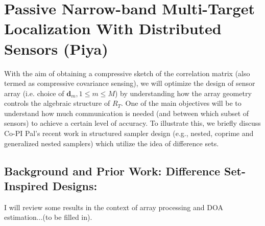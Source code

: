 \section{Passive Narrow-band Multi-Target Localization With Distributed Sensors (Piya)}

With the aim of obtaining a compressive sketch of the correlation matrix (also termed as compressive covariance sensing), we will optimize the design of sensor array (i.e. choice of $\mathbf{d}_m, 1\leq m\leq M$) by understanding how the array geometry controls the algebraic structure of $R_T$. One of the main objectives will be to understand how much communication is needed (and between which subset of sensors) to achieve a certain level of accuracy. To illustrate this, we briefly discuss Co-PI Pal's recent work in structured sampler design (e.g., nested, coprime and generalized nested samplers) which utilize the idea of difference sets.

\subsection{Background and Prior Work: Difference Set-Inspired Designs:} 
I will review some results in the context of array processing and DOA estimation...(to be filled in).
